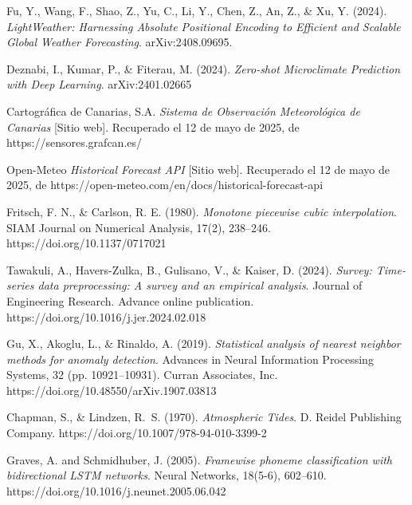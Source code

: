 \documentclass[spanish,a4paper,12pt,oneside]{extreport}
\begin{document}
\begin{thebibliography}{X}
Fu, Y., Wang, F., Shao, Z., Yu, C., Li, Y., Chen, Z., An, Z., \& Xu, Y. (2024). 
\emph{LightWeather: Harnessing Absolute Positional Encoding to Efficient and Scalable Global Weather Forecasting}. arXiv:2408.09695.

Deznabi, I., Kumar, P., \& Fiterau, M. (2024). \emph{Zero-shot Microclimate Prediction with Deep Learning}. arXiv:2401.02665

Cartográfica de Canarias, S.A. \emph{Sistema de Observación Meteorológica de Canarias} [Sitio web]. Recuperado el 12 de mayo de 2025, de https://sensores.grafcan.es/

Open-Meteo \emph{Historical Forecast API} [Sitio web]. Recuperado el 12 de mayo de 2025, de https://open-meteo.com/en/docs/historical-forecast-api

Fritsch, F. N., \& Carlson, R. E. (1980). \emph{Monotone piecewise cubic interpolation}. SIAM Journal on Numerical Analysis, 17(2), 238–246. https://doi.org/10.1137/0717021

Tawakuli, A., Havers-Zulka, B., Gulisano, V., \& Kaiser, D. (2024). \emph{Survey: Time-series data preprocessing: A survey and an empirical analysis}. Journal of Engineering Research. Advance online publication. https://doi.org/10.1016/j.jer.2024.02.018

Gu, X., Akoglu, L., \& Rinaldo, A. (2019). \emph{Statistical analysis of nearest neighbor methods for anomaly detection}. Advances in Neural Information Processing Systems, 32 (pp. 10921–10931). Curran Associates, Inc. https://doi.org/10.48550/arXiv.1907.03813

Chapman, S., \& Lindzen, R.~S. (1970). \textit{Atmospheric Tides}. D. Reidel Publishing Company. https://doi.org/10.1007/978-94-010-3399-2

Graves, A. and Schmidhuber, J. (2005). \textit{Framewise phoneme classification with bidirectional LSTM networks}. Neural Networks, 18(5-6), 602–610. https://doi.org/10.1016/j.neunet.2005.06.042

\end{thebibliography}
\end{document}
